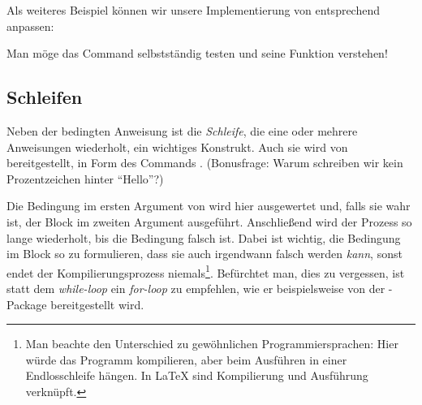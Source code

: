 Als weiteres Beispiel können wir unsere Implementierung von  entsprechend anpassen:
\begin{latexlisting}
	\newcommand{\blank}[1]{%
		\underline{\phantom{#1}%
		\ifthenelse{\boolean{solution}}{%
		#1%
		}{%
		\phantom{#1}%
		}%
		\phantom{#1}%
		}%
	}
\end{latexlisting}
Man möge das Command selbstständig testen und seine Funktion verstehen!

\subsection{Schleifen}

Neben der bedingten Anweisung ist die \emph{Schleife}, die eine oder mehrere Anweisungen wiederholt, ein wichtiges Konstrukt.
Auch sie wird von  bereitgestellt, in Form des Commands .
(Bonusfrage: Warum schreiben wir kein Prozentzeichen hinter \enquote{Hello}?)
\begin{latexlisting}
\end{latexlisting}
Die Bedingung im ersten Argument von  wird hier ausgewertet und, falls sie wahr ist, der Block im zweiten Argument ausgeführt.
Anschließend wird der Prozess so lange wiederholt, bis die Bedingung falsch ist.
Dabei ist wichtig, die Bedingung im Block so zu formulieren, dass sie auch irgendwann falsch werden \emph{kann}, sonst endet der Kompilierungsprozess niemals\footnote{Man beachte den Unterschied zu gewöhnlichen Programmiersprachen: Hier würde das Programm kompilieren, aber beim Ausführen in einer Endlosschleife hängen. In \LaTeX{} sind Kompilierung und Ausführung verknüpft.}.
Befürchtet man, dies zu vergessen, ist statt dem \emph{while-loop} ein \emph{for-loop} zu empfehlen, wie er beispielsweise von der -Package bereitgestellt wird.

